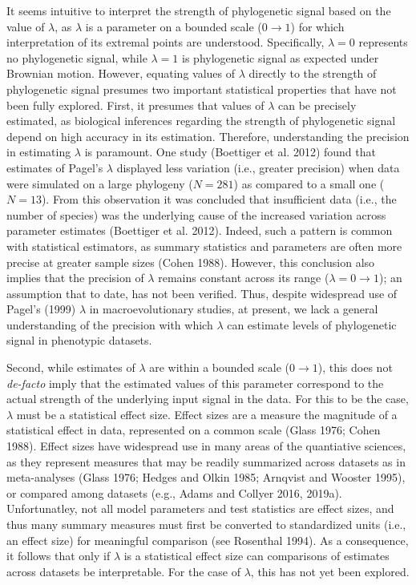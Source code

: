 \documentclass[
]{article}
\begin{document}
It seems intuitive to interpret the strength of phylogenetic signal
based on the value of \(\lambda\), as \(\lambda\) is a parameter on a
bounded scale (\(0\to1\)) for which interpretation of its extremal
points are understood. Specifically, \(\lambda=0\) represents no
phylogenetic signal, while \(\lambda=1\) is phylogenetic signal as
expected under Brownian motion. However, equating values of \(\lambda\)
directly to the strength of phylogenetic signal presumes two important
statistical properties that have not been fully explored. First, it
presumes that values of \(\lambda\) can be precisely estimated, as
biological inferences regarding the strength of phylogenetic signal
depend on high accuracy in its estimation. Therefore, understanding the
precision in estimating \(\lambda\) is paramount. One study (Boettiger
et al. 2012) found that estimates of Pagel's \(\lambda\) displayed less
variation (i.e., greater precision) when data were simulated on a large
phylogeny (\(N=281\)) as compared to a small one (\(N=13\)). From this
observation it was concluded that insufficient data (i.e., the number of
species) was the underlying cause of the increased variation across
parameter estimates (Boettiger et al. 2012). Indeed, such a pattern is
common with statistical estimators, as summary statistics and parameters
are often more precise at greater sample sizes (Cohen 1988). However,
this conclusion also implies that the precision of \(\lambda\) remains
constant across its range (\(\lambda = 0 \to 1\)); an assumption that to
date, has not been verified. Thus, despite widespread use of Pagel's
(1999) \(\lambda\) in macroevolutionary studies, at present, we lack a
general understanding of the precision with which \(\lambda\) can
estimate levels of phylogenetic signal in phenotypic datasets.
\hfill\break

Second, while estimates of \(\lambda\) are within a bounded scale
(\(0\to1\)), this does not \emph{de-facto} imply that the estimated
values of this parameter correspond to the actual strength of the
underlying input signal in the data. For this to be the case,
\(\lambda\) must be a statistical effect size. Effect sizes are a
measure the magnitude of a statistical effect in data, represented on a
common scale (Glass 1976; Cohen 1988). Effect sizes have widespread use
in many areas of the quantiative sciences, as they represent measures
that may be readily summarized across datasets as in meta-analyses
(Glass 1976; Hedges and Olkin 1985; Arnqvist and Wooster 1995), or
compared among datasets (e.g., Adams and Collyer 2016, 2019a).
Unfortunatley, not all model parameters and test statistics are effect
sizes, and thus many summary measures must first be converted to
standardized units (i.e., an effect size) for meaningful comparison (see
Rosenthal 1994). As a consequence, it follows that only if \(\lambda\)
is a statistical effect size can comparisons of estimates across
datasets be interpretable. For the case of \(\lambda\), this has not yet
been explored. \hfill\break
\end{document}
